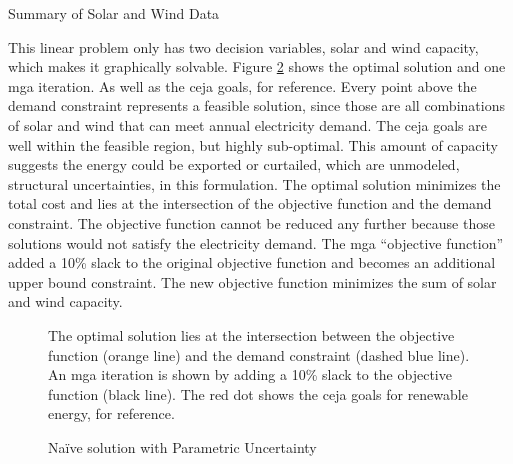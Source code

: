 \begin{table}[H]
  \centering
  \caption{Summary of Solar and Wind Data}
  \label{tab:naive}
  \resizebox{0.75\textwidth}{!}{
  
  }
\end{table}

This linear problem only has two decision variables, solar and wind capacity,
which makes it graphically solvable. Figure \ref{fig:mga-fig} shows the optimal
solution and one \gls{mga} iteration. As well as the \gls{ceja} goals, for reference.
Every point above the demand constraint represents a feasible solution, since
those are all combinations of solar and wind that can meet annual electricity
demand. The \gls{ceja} goals are well within the feasible region, but highly sub-optimal.
This amount of capacity suggests the energy could be exported or curtailed, which are
unmodeled, structural uncertainties, in this formulation.
The optimal solution minimizes the total cost and lies at the intersection
of the objective function and the demand constraint. The objective function cannot
be reduced any further because those solutions would not satisfy the electricity demand.
The \gls{mga} ``objective function'' added a 10\% slack to the original objective function
and becomes an additional upper bound constraint. The new objective function minimizes
the sum of solar and wind capacity.
\begin{figure}[H]
  \centering
  \resizebox{0.8\columnwidth}{!}{}
  \caption{The optimal solution lies at the intersection between the objective
  function (orange line) and the demand constraint (dashed blue line). An \gls{mga}
  iteration is shown by adding a 10\% slack to the objective function (black line).
  The red dot shows the \gls{ceja} goals for renewable energy, for reference.}
  \label{fig:mga-fig}
\end{figure}

\begin{figure}[H]
  \centering
  \resizebox{0.8\columnwidth}{!}{}
  \caption{Na\"{i}ve solution with Parametric Uncertainty}
  \label{fig:mga-fig}
\end{figure}
